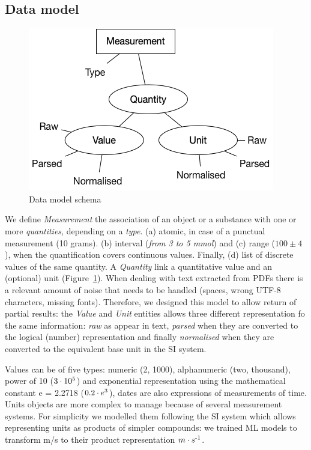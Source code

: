 \documentclass[sigplan, anonymous, review]{acmart}
\begin{document}
\subsection{Data model}
\label{subsub:data-model}
\begin{figure}[ht]
  \centering
  \includegraphics[width=\linewidth]{images/schema-2}
  \caption{Data model schema}
  \label{fig:data-model-schema-2}
\end{figure}
We define \textit{Measurement} the association of an object or a substance with one or more \textit{quantities}, depending on a \textit{type}. (a) atomic, in case of a punctual measurement (10 grams). (b) interval (\textit{from 3 to 5 mmol}) and (c) range ($100 \pm 4$), when the quantification covers continuous values. Finally, (d) list of discrete values of the same quantity. A \textit{Quantity} link a  quantitative value and an (optional) unit (Figure~\ref{fig:data-model-schema-2}). 
When dealing with text extracted from PDFs there is a relevant amount of noise that needs to be handled (spaces, wrong UTF-8 characters, missing fonts). Therefore, we designed this model to allow return of partial results: the \textit{Value} and \textit{Unit} entities allows three different representation fo the same information: \textit{raw} as appear in text, \textit{parsed} when they are converted to the logical (number) representation and finally \textit{normalised} when they are converted to the equivalent base unit in the SI system. 

Values can be of five types: numeric (2, 1000), alphanumeric (two, thousand), power of 10 ($3\cdot10\textsuperscript{5}$) and exponential representation using the mathematical constant e = 2.2718 ($0.2\cdot e\textsuperscript{3}$), dates are also expressions of measurements of time. Units objects are more complex to manage because of several measurement systems. For simplicity we modelled them following the SI system which allows representing units as products of simpler compounds: we trained ML models to transform m/s to their product representation $m \cdot s\textsuperscript{-1}$.
\end{document}

